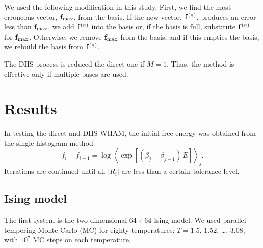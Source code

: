 \documentclass[reprint,superscriptaddress]{revtex4-1}
\begin{document}
We used the following modification
in this study.
%
%
%
%
First, we find the most erroneous vector,
$\mathbf{f}_\mathrm{max}$, from the basis.
%
If the new vector, $\mathbf{f}^{(n)}$,
produces an error less than $\mathbf{f}_\mathrm{max}$,
we add $\mathbf{f}^{(n)}$ into the basis
or, if the basis is full,
substitute $\mathbf{f}^{(n)}$ for $\mathbf{f}_\mathrm{max}$.
%
Otherwise,
we remove $\mathbf{f}_\mathrm{max}$ from the basis,
and if this empties the basis,
we rebuild the basis from $\mathbf{f}^{(n)}$.



The DIIS process is reduced the direct one
if $M = 1$.
%
Thus,
the method is effective
only if multiple bases are used.





\section{Results}





In testing the direct and DIIS WHAM,
the initial free energy was obtained from
the single histogram method:
%
\begin{equation*}
f_i - f_{i-1}
=
\log
\left\langle
  \exp\left[
    (\beta_j - \beta_{j-1}) \, E
  \right]
\right\rangle_j.
\end{equation*}
%
Iterations are continued
until all $|R_i|$ are less than a certain tolerance level.





\subsection{Ising model}





The first system is
the two-dimensional $64\times64$ Ising model.
%
We used parallel tempering\cite{
swendsen1986, *geyer1991, *hukushima1996, *hansmann1997,
*earl2005}
Monte Carlo (MC)
for
eighty temperatures: $T = 1.5$, $1.52$, \dots, $3.08$,
with $10^7$ MC steps on each temperature.
\end{document}
